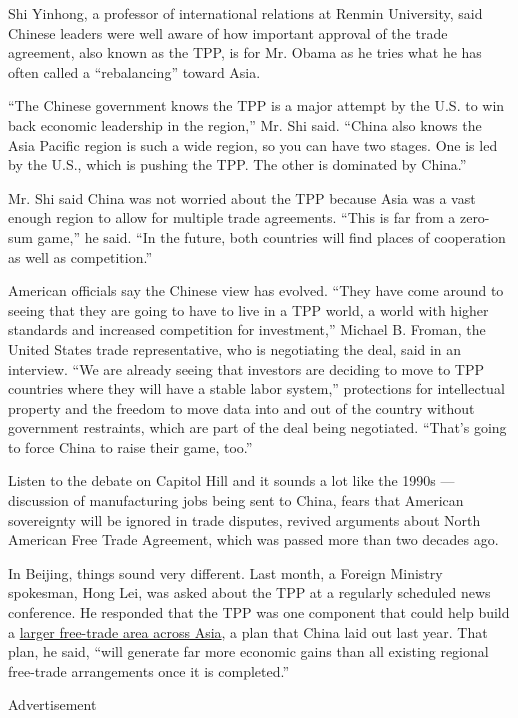 Shi Yinhong, a professor of international relations at Renmin
University, said Chinese leaders were well aware of how important
approval of the trade agreement, also known as the TPP, is for Mr. Obama
as he tries what he has often called a ``rebalancing'' toward Asia.

``The Chinese government knows the TPP is a major attempt by the U.S. to
win back economic leadership in the region,'' Mr. Shi said. ``China also
knows the Asia Pacific region is such a wide region, so you can have two
stages. One is led by the U.S., which is pushing the TPP. The other is
dominated by China.''

Mr. Shi said China was not worried about the TPP because Asia was a vast
enough region to allow for multiple trade agreements. ``This is far from
a zero-sum game,'' he said. ``In the future, both countries will find
places of cooperation as well as competition.''

American officials say the Chinese view has evolved. ``They have come
around to seeing that they are going to have to live in a TPP world, a
world with higher standards and increased competition for investment,''
Michael B. Froman, the United States trade representative, who is
negotiating the deal, said in an interview. ``We are already seeing that
investors are deciding to move to TPP countries where they will have a
stable labor system,'' protections for intellectual property and the
freedom to move data into and out of the country without government
restraints, which are part of the deal being negotiated. ``That's going
to force China to raise their game, too.''

Listen to the debate on Capitol Hill and it sounds a lot like the 1990s
--- discussion of manufacturing jobs being sent to China, fears that
American sovereignty will be ignored in trade disputes, revived
arguments about North American Free Trade Agreement, which was passed
more than two decades ago.

In Beijing, things sound very different. Last month, a Foreign Ministry
spokesman, Hong Lei, was asked about the TPP at a regularly scheduled
news conference. He responded that the TPP was one component that could
help build a
\href{http://www.chinadaily.com.cn/world/2014apec/2014-11/07/content_18885318.htm}{larger
free-trade area across Asia}, a plan that China laid out last year. That
plan, he said, ``will generate far more economic gains than all existing
regional free-trade arrangements once it is completed.''

Advertisement

